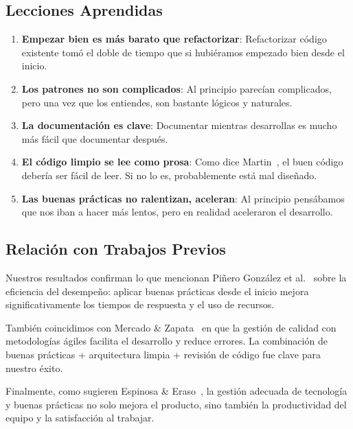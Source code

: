 \subsection{Lecciones Aprendidas}

\begin{enumerate}
    \item \textbf{Empezar bien es más barato que refactorizar}: Refactorizar código existente tomó el doble de tiempo que si hubiéramos empezado bien desde el inicio.
    
    \item \textbf{Los patrones no son complicados}: Al principio parecían complicados, pero una vez que los entiendes, son bastante lógicos y naturales.
    
    \item \textbf{La documentación es clave}: Documentar mientras desarrollas es mucho más fácil que documentar después.
    
    \item \textbf{El código limpio se lee como prosa}: Como dice Martin~\cite{martin2008clean}, el buen código debería ser fácil de leer. Si no lo es, probablemente está mal diseñado.
    
    \item \textbf{Las buenas prácticas no ralentizan, aceleran}: Al principio pensábamos que nos iban a hacer más lentos, pero en realidad aceleraron el desarrollo.
\end{enumerate}

\subsection{Relación con Trabajos Previos}

Nuestros resultados confirman lo que mencionan Piñero González et al.~\cite{pinero2021buenas} sobre la eficiencia del desempeño: aplicar buenas prácticas desde el inicio mejora significativamente los tiempos de respuesta y el uso de recursos.

También coincidimos con Mercado \& Zapata~\cite{mercado2019revision} en que la gestión de calidad con metodologías ágiles facilita el desarrollo y reduce errores. La combinación de buenas prácticas + arquitectura limpia + revisión de código fue clave para nuestro éxito.

Finalmente, como sugieren Espinosa \& Eraso~\cite{espinosa2024gestion}, la gestión adecuada de tecnología y buenas prácticas no solo mejora el producto, sino también la productividad del equipo y la satisfacción al trabajar.
